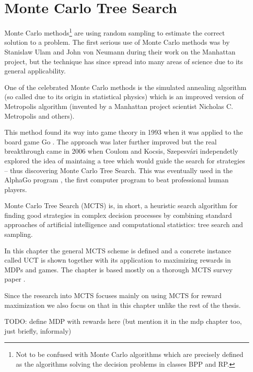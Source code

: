 \chapter{Monte Carlo Tree Search}
\label{ch_mcts}

Monte Carlo methods\footnote{Not to be confused with
Monte Carlo algorithms which are precisely defined as the algorithms
solving the decision problems in classes BPP and RP.} are using random sampling to estimate the correct
solution to a problem. The first serious use of Monte Carlo methods was
by Stanislaw Ulam and John von Neumann during their work on the
Manhattan project, but the technique has since spread into many areas of
science due to its general applicability.

One of the celebrated Monte Carlo methods
is the simulated annealing algorithm (so called due to its
origin in statistical physics) which is an improved version of
Metropolis algorithm (invented by a Manhattan project scientist
Nicholas C. Metropolis and others).

This method found its way into game
theory in 1993 when it was applied to the board game Go
\parencite{MonteCarloGo}. The approach was later further improved
\parencite{MonteCarloGoDevel} but the real breakthrough came in 2006
when Coulom \parencite{Coulom} and Kocsis, Szepesvári \parencite{Kocsis}
independetly explored the idea of maintaing a tree which would guide the
search for strategies -- thus discovering Monte Carlo Tree Search.
This was eventually used in the AlphaGo program
\parencite{AlphaGo}, the first
computer program to beat professional human players.

Monte Carlo Tree Search (MCTS) is, in short, a
heuristic search algorithm for finding good strategies in complex
decision processes by combining standard approaches of artificial
intelligence and computational statistics: tree search and sampling.

In this chapter the general MCTS scheme is defined and a concrete instance
called UCT is shown together with its application to maximizing rewards
in MDPs and games. The chapter is based mostly on a thorough MCTS survey
paper \parencite{mcts_survey}.

Since the research into MCTS focuses mainly on using MCTS for reward maximization
we also focus on that in this chapter unlike the rest of the thesis.

TODO: define MDP with rewards here (but mention it in the mdp chapter
too, just briefly, informaly)

